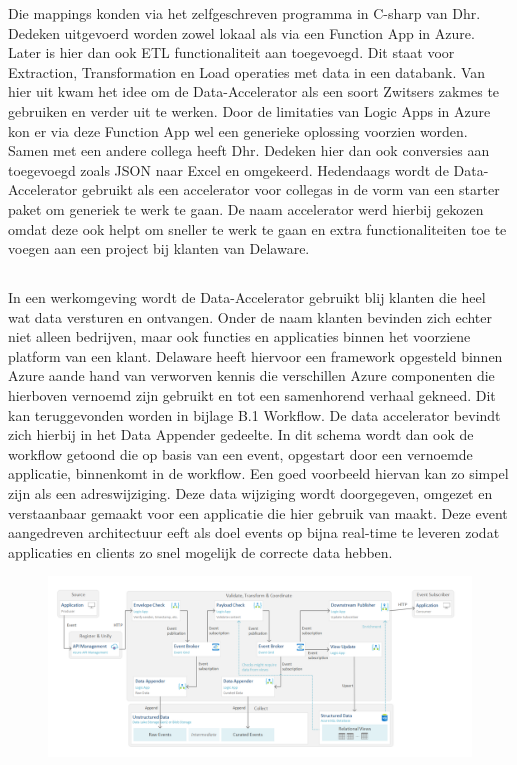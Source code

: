 Die mappings konden via het zelfgeschreven programma in C-sharp van Dhr. Dedeken uitgevoerd worden zowel lokaal als via een Function App in Azure. Later is hier dan ook ETL functionaliteit aan toegevoegd. Dit staat voor Extraction, Transformation en Load operaties met data in een databank. Van hier uit kwam het idee om de Data-Accelerator als een soort Zwitsers zakmes te gebruiken en verder uit te werken. Door de limitaties van Logic Apps in Azure kon er via deze Function App wel een generieke oplossing voorzien worden. Samen met een andere collega heeft Dhr. Dedeken hier dan ook conversies aan toegevoegd zoals JSON naar Excel en omgekeerd. Hedendaags wordt de Data-Accelerator gebruikt als een accelerator voor collegas in de vorm van een starter paket om generiek te werk te gaan. De naam accelerator werd hierbij gekozen omdat deze ook helpt om sneller te werk te gaan en extra functionaliteiten toe te voegen aan een project bij klanten van Delaware.\autocite{LopezNovoa2015}

\subsection{}%
\label{sec:Werkomgeving}

In een werkomgeving wordt de Data-Accelerator gebruikt blij klanten die heel wat data versturen en ontvangen. Onder de naam klanten bevinden zich echter niet alleen bedrijven, maar ook functies en applicaties binnen het voorziene platform van een klant. Delaware heeft hiervoor een framework opgesteld binnen Azure aande hand van verworven kennis die verschillen Azure componenten die hierboven vernoemd zijn gebruikt en tot een samenhorend verhaal gekneed. Dit kan teruggevonden worden in bijlage B.1 Workflow. De data accelerator bevindt zich hierbij in het Data Appender gedeelte. In dit schema wordt dan ook de workflow getoond die op basis van een event, opgestart door een vernoemde applicatie, binnenkomt in de workflow. Een goed voorbeeld hiervan kan zo simpel zijn als een adreswijziging. Deze data wijziging wordt doorgegeven, omgezet en verstaanbaar gemaakt voor een applicatie die hier gebruik van maakt. Deze event aangedreven architectuur eeft als doel events op bijna real-time te leveren zodat applicaties en clients zo snel mogelijk de correcte data hebben.

\begin{figure}
    \includegraphics[scale=0.60]{../img/Workflow.png}
\end{figure}

